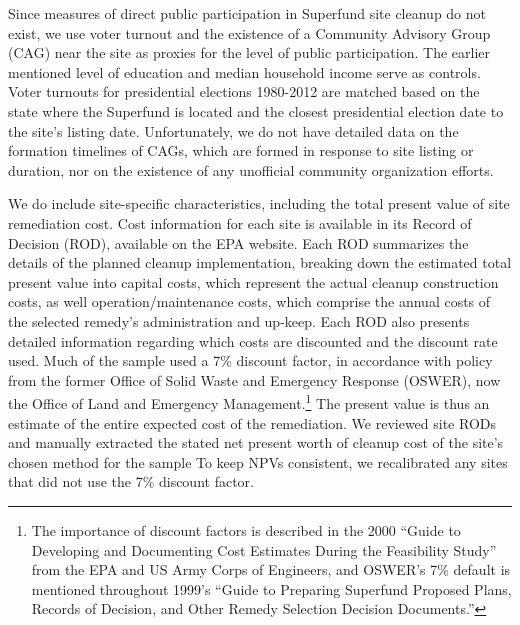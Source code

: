 \documentclass[12pt]{article}
\begin{document}
Since measures of direct public participation in Superfund site cleanup do not exist, we use voter turnout and the existence of a Community Advisory Group (CAG) 
near the site as proxies for the level of public participation. The earlier mentioned level of education and median household income serve as controls. Voter turnouts for presidential elections 1980-2012 are matched based on the state where the Superfund is located and the closest presidential election date to the site's listing date. Unfortunately, we do not have detailed data on the formation timelines of CAGs, which are formed in response to site listing or duration, nor on the existence of any unofficial community organization efforts.

We do include site-specific characteristics, including the total present value of site remediation cost. Cost information for each site is available in its Record of Decision (ROD), available on the EPA website. Each ROD summarizes the details of the planned cleanup implementation, breaking down the estimated total present value into capital costs, which represent the actual cleanup construction costs, as well operation/maintenance costs, which comprise the annual costs of the selected remedy's administration and up-keep. Each ROD also presents detailed information regarding which costs are discounted and the discount rate used. Much of the sample used a 7\% discount factor, in accordance with policy from the former Office of Solid Waste and Emergency Response (OSWER), now the Office of Land and Emergency Management.\footnote{The importance of discount factors is described in the 2000 ``Guide to Developing and Documenting Cost Estimates During the Feasibility Study'' from the EPA and US Army Corps of Engineers, and OSWER's 7\% default is mentioned throughout 1999's ``Guide to Preparing Superfund Proposed Plans, Records of Decision, and Other Remedy Selection Decision Documents.''} The present value is thus an estimate of the entire expected cost of the remediation. We reviewed site RODs and manually extracted the stated net present worth of cleanup cost of the site's chosen method for the sample {To keep NPVs consistent, we recalibrated any sites that did not use the 7\% discount factor.}
\end{document}
